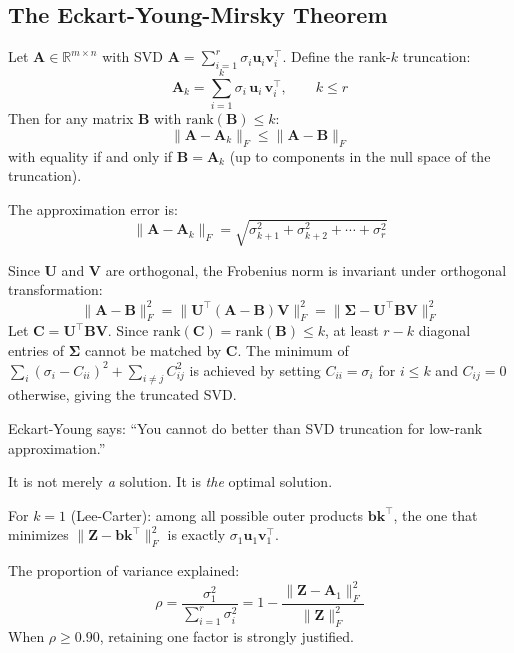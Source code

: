 \documentclass[11pt,a4paper]{article}
\begin{document}
\subsection{The Eckart-Young-Mirsky Theorem}

\begin{formaldef}
Let $\bm{A} \in \mathbb{R}^{m \times n}$ with SVD $\bm{A} = \sum_{i=1}^{r} \sigma_i \bm{u}_i \bm{v}_i^\top$.
Define the rank-$k$ truncation:
\[
\bm{A}_k = \sum_{i=1}^{k} \sigma_i \, \bm{u}_i \, \bm{v}_i^\top, \qquad k \leq r
\]
Then for any matrix $\bm{B}$ with $\mathrm{rank}(\bm{B}) \leq k$:
\[
\|\bm{A} - \bm{A}_k\|_F \leq \|\bm{A} - \bm{B}\|_F
\]
with equality if and only if $\bm{B} = \bm{A}_k$ (up to components in the null space of the truncation).

The approximation error is:
\[
\|\bm{A} - \bm{A}_k\|_F = \sqrt{\sigma_{k+1}^2 + \sigma_{k+2}^2 + \cdots + \sigma_r^2}
\]
\end{formaldef}

\begin{formaldef}
Since $\bm{U}$ and $\bm{V}$ are orthogonal, the Frobenius norm is invariant under orthogonal transformation:
\[
\|\bm{A} - \bm{B}\|_F^2 = \|\bm{U}^\top(\bm{A} - \bm{B})\bm{V}\|_F^2 = \|\bm{\Sigma} - \bm{U}^\top\bm{B}\bm{V}\|_F^2
\]
Let $\bm{C} = \bm{U}^\top \bm{B} \bm{V}$. Since $\mathrm{rank}(\bm{C}) = \mathrm{rank}(\bm{B}) \leq k$, at least
$r - k$ diagonal entries of $\bm{\Sigma}$ cannot be matched by $\bm{C}$. The minimum of
$\sum_{i} (\sigma_i - C_{ii})^2 + \sum_{i \neq j} C_{ij}^2$ is achieved by setting
$C_{ii} = \sigma_i$ for $i \leq k$ and $C_{ij} = 0$ otherwise, giving the truncated SVD.
\end{formaldef}

\begin{intuition}
Eckart-Young says: ``You cannot do better than SVD truncation for low-rank approximation.''

It is not merely \emph{a} solution. It is \emph{the} optimal solution.

For $k = 1$ (Lee-Carter): among all possible outer products $\bm{b}\bm{k}^\top$, the one that
minimizes $\|\bm{Z} - \bm{b}\bm{k}^\top\|_F^2$ is exactly $\sigma_1 \bm{u}_1 \bm{v}_1^\top$.

The proportion of variance explained:
\[
\rho = \frac{\sigma_1^2}{\sum_{i=1}^{r} \sigma_i^2} = 1 - \frac{\|\bm{Z} - \bm{A}_1\|_F^2}{\|\bm{Z}\|_F^2}
\]
When $\rho \geq 0.90$, retaining one factor is strongly justified.
\end{intuition}
\end{document}
